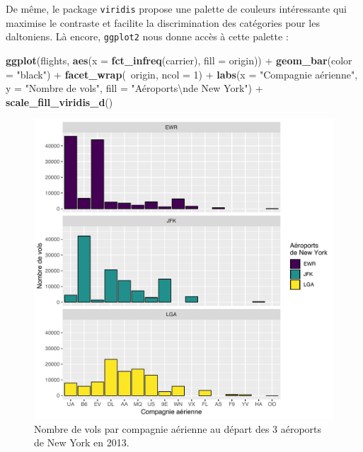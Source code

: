 \documentclass[a4paperpaper,]{article}
\newenvironment{Shaded}{\begin{snugshade}}{\end{snugshade}}
\newcommand{\CharTok}[1]{\textcolor[rgb]{0.57,0.30,0.62}{#1}}
\newcommand{\DataTypeTok}[1]{\textcolor[rgb]{0.00,0.34,0.68}{#1}}
\newcommand{\DecValTok}[1]{\textcolor[rgb]{0.69,0.50,0.00}{#1}}
\newcommand{\KeywordTok}[1]{\textcolor[rgb]{0.12,0.11,0.11}{\textbf{#1}}}
\newcommand{\NormalTok}[1]{\textcolor[rgb]{0.12,0.11,0.11}{#1}}
\newcommand{\OperatorTok}[1]{\textcolor[rgb]{0.12,0.11,0.11}{#1}}
\newcommand{\StringTok}[1]{\textcolor[rgb]{0.75,0.01,0.01}{#1}}
\begin{document}
De même, le package \texttt{viridis} propose une palette de couleurs intéressante qui maximise le contraste et facilite la discrimination des catégories pour les daltoniens. Là encore, \texttt{ggplot2} nous donne accès à cette palette :

\begin{Shaded}
\begin{Highlighting}[]
\KeywordTok{ggplot}\NormalTok{(flights, }\KeywordTok{aes}\NormalTok{(}\DataTypeTok{x =} \KeywordTok{fct_infreq}\NormalTok{(carrier), }\DataTypeTok{fill =}\NormalTok{ origin)) }\OperatorTok{+}
\StringTok{  }\KeywordTok{geom_bar}\NormalTok{(}\DataTypeTok{color =} \StringTok{"black"}\NormalTok{) }\OperatorTok{+}
\StringTok{  }\KeywordTok{facet_wrap}\NormalTok{(}\OperatorTok{~}\NormalTok{origin, }\DataTypeTok{ncol =} \DecValTok{1}\NormalTok{) }\OperatorTok{+}
\StringTok{  }\KeywordTok{labs}\NormalTok{(}\DataTypeTok{x =} \StringTok{"Compagnie aérienne"}\NormalTok{,}
       \DataTypeTok{y =} \StringTok{"Nombre de vols"}\NormalTok{,}
       \DataTypeTok{fill =} \StringTok{"Aéroports}\CharTok{\textbackslash{}n}\StringTok{de New York"}\NormalTok{) }\OperatorTok{+}
\StringTok{  }\KeywordTok{scale_fill_viridis_d}\NormalTok{()}
\end{Highlighting}
\end{Shaded}

\begin{figure}[htpb]

{\centering \includegraphics[width=0.9\linewidth]{figure/barfacetviridis-1} 

}

\caption{Nombre de vols par compagnie aérienne au départ des 3 aéroports de New York en 2013.}\label{fig:barfacetviridis}
\end{figure}
\end{document}
